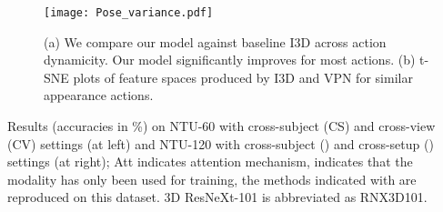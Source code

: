 \documentclass[runningheads]{llncs}
\begin{document}
\begin{figure}
\centering
\texttt{[image: Pose\_variance.pdf]}
\caption{ (a) We compare our model against baseline I3D across action dynamicity. Our model significantly improves for most actions. (b) t-SNE plots of feature spaces produced by I3D and VPN for similar appearance actions. }\vspace{-1em}
\label{visualization}
\end{figure}


\begin{table}[!ht]
\caption{Results (accuracies in \%) on NTU-60 with cross-subject (CS) and cross-view (CV) settings (at left) and NTU-120 with cross-subject () and cross-setup () settings (at right); Att indicates attention mechanism,  indicates that the modality has only been used for training, the methods indicated with  are reproduced on this dataset. 3D ResNeXt-101 is abbreviated as RNX3D101.}
 

\end{table}
\end{document}
